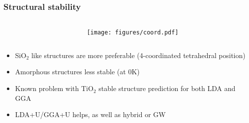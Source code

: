 \documentclass[noamsthm,8pt,t]{beamer}
\begin{document}
\begin{frame}
   \frametitle{Structural stability}
   \begin{columns}
      \begin{column}{0.67\textwidth}
            \begin{center}
            \end{center}
      \end{column}
      \begin{column}{0.33\textwidth}
         \begin{center}
            \texttt{[image: figures/coord.pdf]}
         \end{center}
      \end{column}
   \end{columns}
   \begin{itemize}
      \item SiO$_2$ like structures are more preferable (4-coordinated tetrahedral position)
      \item Amorphous structures less stable (at 0K)
      \item<2-> Known problem with TiO$_2$ stable structure prediction for both LDA and GGA 
      \item<2-> LDA+U/GGA+U helps\footnotemark, as well as hybrid or GW
   \end{itemize}
\end{frame}
\end{document}

